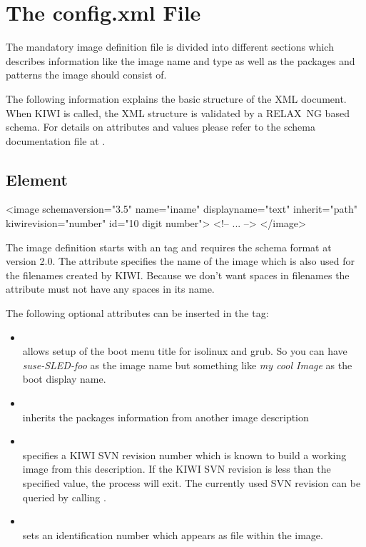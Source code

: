 \section{The config.xml File}
The mandatory image definition file is divided into different sections
which describes information like the image name and type as well as
the packages and patterns the image should consist of.

The following information explains the basic structure of the XML document. When KIWI
is called, the XML structure is validated by a RELAX~NG based schema.
For details on attributes and values please refer to the schema
documentation file at .

\subsection{ Element}
\begin{xml}
<image schemaversion="3.5" name="iname"
 displayname="text"
 inherit="path" kiwirevision="number"
 id="10 digit number">
  <!-- ... -->
</image>
\end{xml}

The image definition starts with an  tag and requires the
schema format at version 2.0. The attribute  specifies the
name of the image which is also used for the filenames created
by KIWI. Because we don't want spaces in filenames the 
attribute must not have any spaces in its name.

The following optional attributes can be inserted in the  tag:
\begin{itemize}
\item {}\\
      allows setup of the boot
      menu title for isolinux and grub. So you can have
      \textit{suse-SLED-foo} as the image name but something like
      \textit{my cool Image} as the boot display name.

\item {} \\
      inherits the packages information from another image description

\item {} \\
      specifies a KIWI SVN revision number which is known to build
      a working image from this description. If the KIWI SVN
      revision is less than the specified value, the
      process will exit. The currently used SVN revision can
      be queried by calling .

\item {}\\
      sets an identification
      number which appears as file  within the
      image.
\end{itemize}

